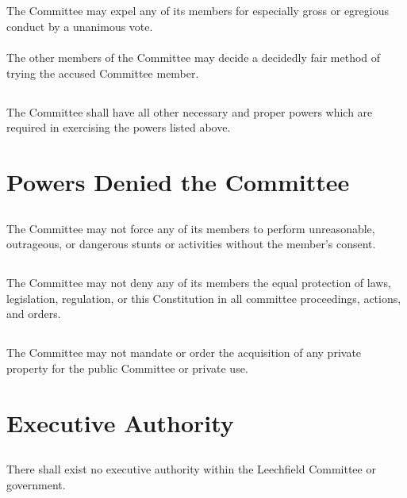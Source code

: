 \documentclass[6pt]{bill}
\begin{document}
{		\subsection{}{
			The Committee may expel any of its members for especially gross or egregious conduct by a unanimous vote.
			\paragraph{}{
				The other members of the Committee may decide a decidedly fair method of trying the accused Committee member.
			}
		}
		
		
		
		\subsection{}{
			The Committee shall have all other necessary and proper powers which are required in exercising the powers listed above.
		}
	}
	\section{Powers Denied the Committee}{
		\subsection{}{
			The Committee may not force any of its members to perform unreasonable, outrageous, or dangerous stunts or activities without the member's consent.
		}
		\subsection{}{
			The Committee may not deny any of its members the equal protection of laws, legislation, regulation, or this Constitution in all committee proceedings, actions, and orders.
		}
		\subsection{}{
			The Committee may not mandate or order the acquisition of any private property for the public Committee or private use.
		}
	}
	
	\title{}
	
	\section{Executive Authority}{
		\subsection{}{
			There shall exist no executive authority within the Leechfield Committee or government.
		}
	}
\end{document}
